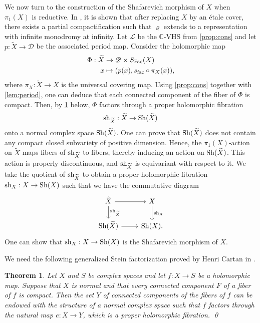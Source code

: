 \documentclass[english]{amsproc}
\theoremstyle{plain}
\newtheorem{thm}{Theorem}[section]
\theoremstyle{definition}
\theoremstyle{remark}
\theoremstyle{plain}
\numberwithin{equation}{thm} %
\newcommand{\sD}{\mathscr{D}}
\newcommand{\cL}{\mathcal L}
\newcommand{\bC}{\mathbb{C}}
\begin{document}
We now turn to the construction of the Shafarevich morphism of $X$ when $\pi_1(X)$ is reductive. In \cite[Proposition 3.19]{DY23}, it is shown that after replacing $X$ by an \'etale cover, there exists a partial compactification such that $\varrho$ extends to a representation with infinite monodromy at infinity. Let $\cL$ be the $\bC$-VHS from \cref{prop:cons} and let $p:\widetilde{X}\to\sD$ be the associated period map. Consider the holomorphic map
\begin{align*}
	\Phi:\widetilde{X} &\to \sD \times S_{\rm Fac}(X)\\
	x & \mapsto (p(x), s_{\rm fac}\circ \pi_X(x)),
\end{align*}
where $\pi_X:\widetilde{X}\to X$ is the universal covering map. Using \cref{prop:cons} together with \cref{lem:period}, one can deduce that each connected component of the fiber of $\Phi$ is compact. Then, by \cref{lem:Stein}  below, $\Phi$ factors through a proper holomorphic fibration
$$
{\rm sh}_{\widetilde{X}}: \widetilde{X}\to {\rm Sh}(\widetilde{X})
$$
onto a normal complex space ${\rm Sh}(\widetilde{X})$. One can prove that ${\rm Sh}(\widetilde{X})$ does not contain any compact closed subvariety of positive dimension. Hence, the $\pi_1(X)$-action on $\widetilde{X}$ maps fibers of ${\rm sh}_{\widetilde{X}}$ to fibers, thereby inducing an action on ${\rm Sh}(\widetilde{X})$. This action is properly discontinuous, and ${\rm sh}_{\widetilde{X}}$ is equivariant with respect to it. We take the quotient of ${\rm sh}_{\widetilde{X}}$ to obtain a proper holomorphic fibration ${\rm sh}_X: X\to {\rm Sh}(X)$ such that  we have the commutative diagram
\[
\begin{tikzcd}
	\widetilde{X}\arrow[r] \arrow[d,"{\rm sh}_{\widetilde{X}}"] & X\arrow[d,"{\rm sh}_X"] \\
	{\rm Sh}(\widetilde{X}) \arrow[r]& {\rm Sh}(X).
\end{tikzcd}
\]
One can show that ${\rm sh}_X: X\to {\rm Sh}(X)$  is the Shafarevich morphism of $X$. 

We need the following generalized Stein factorization proved by Henri Cartan in \cite[Theorem 3]{Car60}.

\begin{thm}\label{lem:Stein}
	Let $X$ and $S$ be complex spaces and let $f: X \rightarrow S$ be a holomorphic map. Suppose that $X$ is normal and that every connected component $F$ of a fiber of $f$ is compact. Then the set $Y$ of connected components of the fibers of $f$ can be endowed with the structure of a normal complex space such that $f$ factors through the natural map $e: X \rightarrow Y$, which is a proper holomorphic fibration. \qed
\end{thm} 
\end{document}
